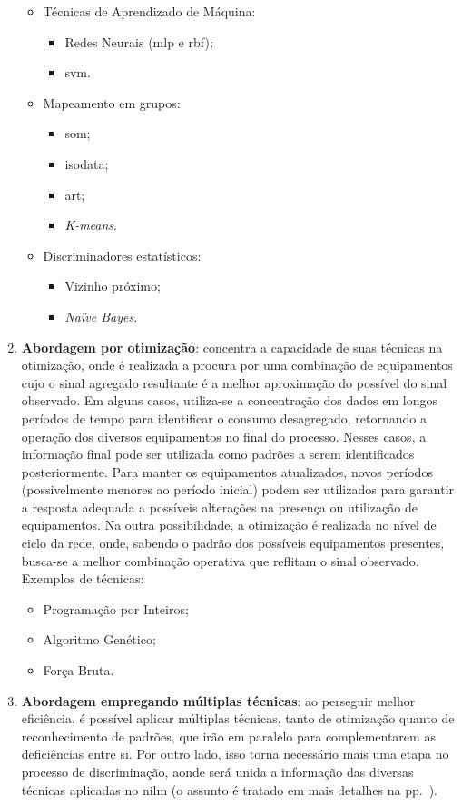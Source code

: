 \begin{enumerate}[label={Abordagem} \arabic* - ,ref=\arabic*,align=left]
\begin{itemize}
\item Técnicas de Aprendizado de Máquina:
\begin{itemize}
\item Redes Neurais (\gls{mlp} e \gls{rbf});
\item \gls{svm}.
\end{itemize}
\item Mapeamento em grupos:
\begin{itemize}
\item \gls{som};
\item \gls{isodata};
\item \gls{art};
\item \emph{K-means}.
\end{itemize}
\item Discriminadores estatísticos:
\begin{itemize}
\item Vizinho próximo;
\item \emph{Naïve Bayes}.
\end{itemize}
\end{itemize}
\item\label{itm:abordagem2}\textbf{Abordagem
por otimização}: concentra a capacidade de
suas técnicas na otimização, onde é realizada a procura por uma
combinação de equipamentos cujo o sinal agregado resultante é a melhor
aproximação do possível do sinal observado. Em alguns casos,
utiliza-se a concentração dos dados em longos períodos de tempo para
identificar o consumo desagregado, retornando a operação dos diversos
equipamentos no final do processo. Nesses casos, a informação final
pode ser utilizada como padrões a serem identificados posteriormente.
Para manter os equipamentos atualizados, novos períodos (possivelmente
menores ao período inicial) podem ser utilizados para garantir a
resposta adequada a possíveis alterações na presença ou utilização de
equipamentos. Na outra possibilidade, a otimização é realizada no nível
de ciclo da rede, onde, sabendo o padrão dos possíveis equipamentos
presentes, busca-se a melhor combinação operativa que reflitam o sinal
observado. Exemplos de técnicas:
\begin{itemize}
\item Programação por Inteiros;
\item Algoritmo Genético;
\item Força Bruta.
\end{itemize}
\item\label{itm:abordagem3}\textbf{Abordagem empregando múltiplas
técnicas}: ao perseguir melhor eficiência, é possível aplicar
múltiplas técnicas, tanto de otimização quanto de reconhecimento de
padrões, que irão em paralelo para complementarem as deficiências
entre si. Por outro lado, isso torna necessário mais uma etapa no
processo de discriminação, aonde será unida a informação das diversas
técnicas aplicadas no \acs{nilm} (o assunto é tratado em mais detalhes
na pp.~\pageref{nilm:multiplas_tecnicas}).
\end{enumerate}

